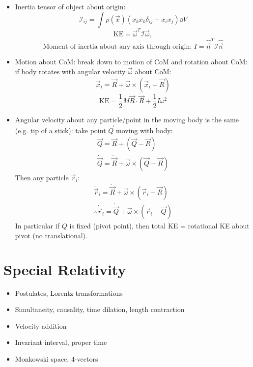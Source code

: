 \begin{itemize}
    \item Inertia tensor of object about origin: \[\mathcal{I}_{ij} = \int \rho(\vec{x}) (x_k x_k \delta_{ij} - x_i x_j) \dd{V} \]
          \[\text{KE} = \vec{\omega}^T \mathcal{I}\vec{\omega}, \]
          \[\text{Moment of inertia about any axis through origin: } I = \hat{\vec{n}}^T \mathcal{I}\hat{\vec{n}} \]

    \item Motion about CoM: break down to motion of CoM and rotation about CoM:
          if body rotates with angular velocity $\vec{\omega}$ about CoM:
          \[\dot{\vec{x}}_i = \dot{\vec{R}} + \vec{\omega} \times (\vec{x}_i-\vec{R}) \]
          \[\text{KE} = \frac{1}{2} M \dot{\vec{R}} \cdot \dot{\vec{R}} + \frac{1}{2}I \omega^2\]

    \item Angular velocity about any particle/point in the moving body is the same (e.g. tip of a stick): take point $\vec{Q}$ moving with body:
          \begin{align*}
              \vec{Q} = \vec{R} + (\vec{Q}-\vec{R}) \\
              \dot{\vec{Q}} = \dot{\vec{R}} + \vec{\omega} \times (\vec{Q}-\vec{R})
          \end{align*}
          Then any particle $\vec{r}_i$:
          \begin{align*}
              \dot{\vec{r}}_i = \dot{\vec{R}} + \vec{\omega} \times (\vec{r}_i-\vec{R}) \\
              \therefore \dot{\vec{r}}_i = \dot{\vec{Q}} + \vec{\omega} \times (\vec{r}_i-\vec{Q})
          \end{align*}
          In particular if $Q$ is fixed (pivot point), then total KE = rotational KE about pivot (no translational).
\end{itemize}



\section{Special Relativity}
\begin{itemize}
    \item Postulates, Lorentz transformations
    \item Simultaneity, causality, time dilation, length contraction
    \item Velocity addition
    \item Invariant interval, proper time
    \item Monkowski space, 4-vectors
\end{itemize}



